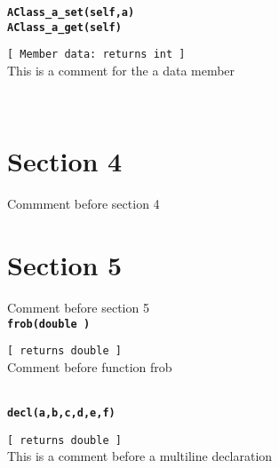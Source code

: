 {\tt \bf AClass\_a\_set(self,a)\\
AClass\_a\_get(self) }
\\
\makebox[0.5in]{}\begin{minipage}[t]{6in}
{\tt [ Member data: returns int  ]  }\\
   This is a comment for the a data member   
\\

\end{minipage}\\

\section{Section 4}   Commment before section 4   
\\\section{Section 5}   Comment before section 5   
\\{\tt \bf frob(double ) }
\\
\makebox[0.5in]{}\begin{minipage}[t]{6in}
{\tt [ returns double  ]  }\\
   Comment before function frob   
\\

\end{minipage}\\

{\tt \bf decl(a,b,c,d,e,f) }
\\
\makebox[0.5in]{}\begin{minipage}[t]{6in}
{\tt [ returns double  ]  }\\
   This is a comment before a multiline declaration   
\\

\end{minipage}\\



